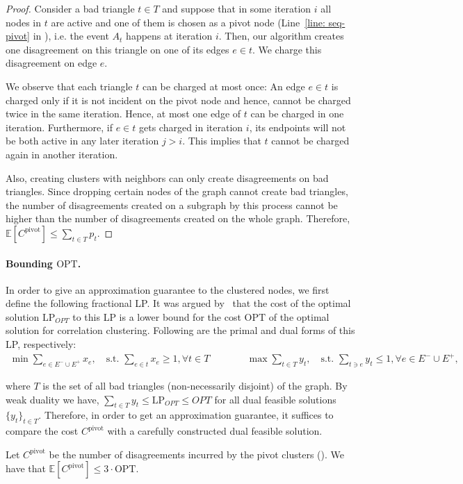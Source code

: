 \documentclass{theoretics}
\newcommand{\E}{\mathbb{E}}
\newcommand{\lp}{\textrm{LP}\xspace}
\newcommand{\ourcluster}{\ensuremath{C^{\textrm{pivot}}}\xspace}
\newcommand{\opt}{\textrm{OPT}\xspace}
\begin{document}
\begin{proof}
    Consider a bad triangle $t \in T$ and suppose that in some iteration $i$ all nodes in $t$ are active and one of them is chosen as a pivot node (Line~\ref{line: seq-pivot} in ), i.e. the event $A_t$ happens at iteration $i$.
    Then, our algorithm creates one disagreement on this triangle on one of its edges $e \in t$.
    We charge this disagreement on edge $e$.
    
    We observe that each triangle $t$ can be charged at most once:
    An edge $e \in t$ is charged only if it is not incident on the pivot node and hence, cannot be charged twice in the same iteration. 
    Hence, at most one edge of $t$ can be charged in one iteration.
    Furthermore, if $e\in t$ gets charged in iteration $i$, its endpoints will not be both active in any later iteration $j > i$.
    This implies that $t$ cannot be charged again in another iteration.
    
    Also, creating clusters with neighbors can only create disagreements on bad triangles.
    Since dropping certain nodes of the graph cannot create bad triangles, the number of disagreements created on a subgraph by this process cannot be higher than the number of disagreements created on the whole graph.
    Therefore, $\E[\ourcluster] \leq \sum_{t \in T} p_t$.
\end{proof}


\paragraph*{Bounding $\opt$.}
In order to give an approximation guarantee to the clustered nodes, we first define the following fractional \lp. 
It was argued by~\cite{ailon2008aggregating} that the cost of the optimal solution $\lp_{OPT}$ to this \lp is a lower bound for the cost $\opt$ of the optimal solution for correlation clustering. Following are the primal and dual forms of this \lp, respectively:
    \begin{align}\label{formula:LP}
        \min \sum_{e\in E^{-}\cup E^{+}}x_e, \quad
        \text{s.t. } \sum_{e\in t}x_e \geq 1, \forall t\in T  \quad \qquad 
        &\max\sum_{t\in T}y_t, \quad
        \text{s.t. } \sum_{t\ni e}y_t \leq 1, \forall e\in E^-\cup E^+,
    \end{align}

where $T$ is the set of all bad triangles (non-necessarily disjoint) of the graph. 
By weak duality we have, $\sum_{t \in T}y_t \leq \lp_{OPT} \leq OPT$ for all dual feasible solutions $\{y_t\}_{t\in T}$. 
Therefore, in order to get an approximation guarantee, it suffices to compare the cost \ourcluster with a carefully constructed dual feasible solution. 
\begin{lemma}
    \label{lemma: pivotcost}
  Let \ourcluster be the number of disagreements incurred by the pivot clusters (). We have that $\E[\ourcluster] \leq 3 \cdot \opt$.
\end{lemma}
\end{document}

